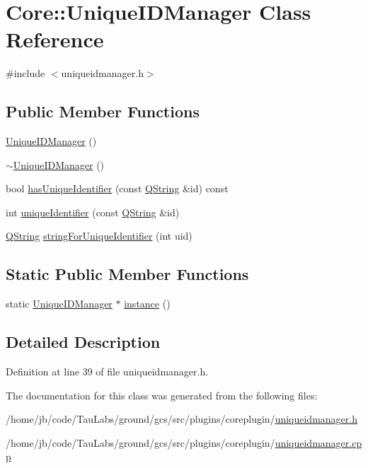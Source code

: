\hypertarget{class_core_1_1_unique_i_d_manager}{\section{\-Core\-:\-:\-Unique\-I\-D\-Manager \-Class \-Reference}
\label{class_core_1_1_unique_i_d_manager}
}


{\ttfamily \#include $<$uniqueidmanager.\-h$>$}

\subsection*{\-Public \-Member \-Functions}
\begin{DoxyCompactItemize}
\item 
\hyperlink{group___core_plugin_ga6dccdc6ad65700076ffc7fa5636e32c7}{\-Unique\-I\-D\-Manager} ()
\item 
\hyperlink{group___core_plugin_ga74fea407a399cb61e5f626e68fb66ecb}{$\sim$\-Unique\-I\-D\-Manager} ()
\item 
bool \hyperlink{group___core_plugin_ga2f6cd087d32efa11b3979cf128fa1d77}{has\-Unique\-Identifier} (const \hyperlink{group___u_a_v_objects_plugin_gab9d252f49c333c94a72f97ce3105a32d}{\-Q\-String} \&id) const 
\item 
int \hyperlink{group___core_plugin_ga753353ca9958604a964c9cf807b77e60}{unique\-Identifier} (const \hyperlink{group___u_a_v_objects_plugin_gab9d252f49c333c94a72f97ce3105a32d}{\-Q\-String} \&id)
\item 
\hyperlink{group___u_a_v_objects_plugin_gab9d252f49c333c94a72f97ce3105a32d}{\-Q\-String} \hyperlink{group___core_plugin_ga238c5f6580483438c581dfa0c5be022c}{string\-For\-Unique\-Identifier} (int uid)
\end{DoxyCompactItemize}
\subsection*{\-Static \-Public \-Member \-Functions}
\begin{DoxyCompactItemize}
\item 
static \hyperlink{class_core_1_1_unique_i_d_manager}{\-Unique\-I\-D\-Manager} $\ast$ \hyperlink{group___core_plugin_ga023f468a9492c282025fde5109e3d368}{instance} ()
\end{DoxyCompactItemize}


\subsection{\-Detailed \-Description}


\-Definition at line 39 of file uniqueidmanager.\-h.



\-The documentation for this class was generated from the following files\-:\begin{DoxyCompactItemize}
\item 
/home/jb/code/\-Tau\-Labs/ground/gcs/src/plugins/coreplugin/\hyperlink{uniqueidmanager_8h}{uniqueidmanager.\-h}\item 
/home/jb/code/\-Tau\-Labs/ground/gcs/src/plugins/coreplugin/\hyperlink{uniqueidmanager_8cpp}{uniqueidmanager.\-cpp}\end{DoxyCompactItemize}
